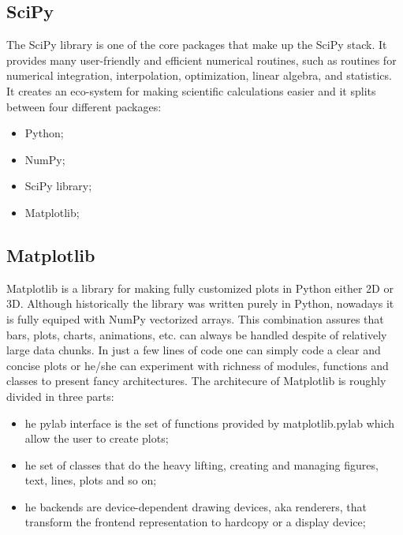 \documentclass[a4paper,oneside,openright,11pt]{book}
\begin{document}
\subsection{SciPy}

The SciPy \cite{scp} library is one of the core packages that make up the SciPy stack. It provides many user-friendly and efficient numerical routines, such as routines for numerical integration, interpolation, optimization, linear algebra, and statistics. It creates an eco-system for making scientific calculations easier and it splits between four different packages:

\begin{itemize}
    \item Python;
    \item NumPy;
    \item SciPy library;
    \item Matplotlib;
\end{itemize}


\subsection{Matplotlib}

Matplotlib \cite{mpl} \cite{Hunter:2007} is a library for making fully customized plots in Python either 2D or 3D. Although historically the library was written purely in Python, nowadays it is fully equiped with NumPy vectorized arrays. This combination assures that bars, plots, charts, animations, etc. can always be handled despite of relatively large data chunks. In just a few lines of code one can simply code a clear and concise plots or he/she can experiment with richness of modules, functions and classes to present fancy architectures. The architecure of Matplotlib is roughly divided in three parts:

\begin{itemize}
    \item he pylab interface is the set of functions provided by matplotlib.pylab which allow the user to create plots;
    \item he set of classes that do the heavy lifting, creating and managing figures, text, lines, plots and so on;
    \item he backends are device-dependent drawing devices, aka renderers, that transform the frontend representation to hardcopy or a display device;
\end{itemize}
\end{document}

